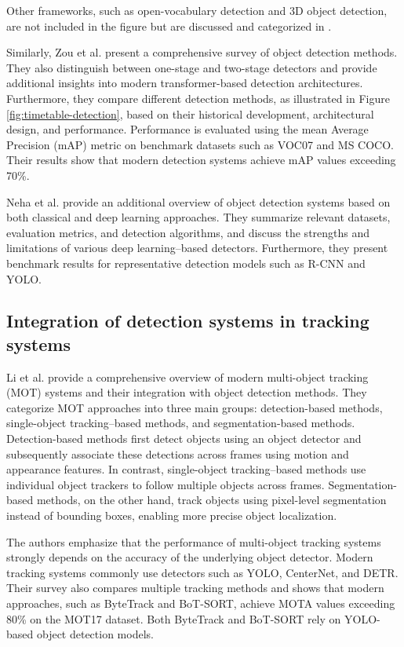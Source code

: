 Other frameworks, such as open-vocabulary detection and 3D object detection, are not included in the figure but are discussed and categorized in \cite{edozie}.

Similarly, Zou et al. \cite{zou} present a comprehensive survey of object detection methods. They also distinguish between one-stage and two-stage detectors and provide additional insights into modern transformer-based detection architectures. Furthermore, they compare different detection methods, as illustrated in Figure \ref{fig:timetable-detection}, based on their historical development, architectural design, and performance. Performance is evaluated using the mean Average Precision (mAP) metric on benchmark datasets such as VOC07 and MS COCO. Their results show that modern detection systems achieve mAP values exceeding 70\%.

Neha et al. \cite{neha} provide an additional overview of object detection systems based on both classical and deep learning approaches. They summarize relevant datasets, evaluation metrics, and detection algorithms, and discuss the strengths and limitations of various deep learning–based detectors. Furthermore, they present benchmark results for representative detection models such as R-CNN and YOLO.

\subsection{Integration of detection systems in tracking systems}


Li et al. \cite{li} provide a comprehensive overview of modern multi-object tracking (MOT) systems and their integration with object detection methods. They categorize MOT approaches into three main groups: detection-based methods, single-object tracking–based methods, and segmentation-based methods. Detection-based methods first detect objects using an object detector and subsequently associate these detections across frames using motion and appearance features. In contrast, single-object tracking–based methods use individual object trackers to follow multiple objects across frames. Segmentation-based methods, on the other hand, track objects using pixel-level segmentation instead of bounding boxes, enabling more precise object localization.

The authors emphasize that the performance of multi-object tracking systems strongly depends on the accuracy of the underlying object detector. Modern tracking systems commonly use detectors such as YOLO, CenterNet, and DETR. Their survey also compares multiple tracking methods and shows that modern approaches, such as ByteTrack and BoT-SORT, achieve MOTA values exceeding 80\% on the MOT17 dataset. Both ByteTrack and BoT-SORT rely on YOLO-based object detection models.

